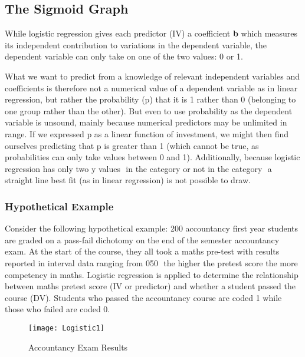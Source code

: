 \documentclass[a4paper,12pt]{article}
\begin{document}
\subsection{The Sigmoid Graph}
While logistic regression gives each predictor (IV) a coefficient \textbf{b} which measures its
independent contribution to variations in the dependent variable, the dependent variable
can only take on one of the two values: 0 or 1.

What we want to predict from a knowledge of relevant independent variables and coefficients is therefore not a numerical value of a
dependent variable as in linear regression, but rather the probability (p) that it is 1 rather
than 0 (belonging to one group rather than the other). But even to use probability as the dependent variable is unsound, mainly because numerical predictors may be unlimited in range. If we expressed p as a linear function of investment, we might then find ourselves predicting that p is greater than 1 (which cannot be true, as
probabilities can only take values between 0 and 1). Additionally, because logistic regression
has only two y values  in the category or not in the category  a straight line best fit (as in
linear regression) is not possible to draw.
\subsubsection{Hypothetical Example}
Consider the following hypothetical example:
200 accountancy first year students are graded on a pass-fail dichotomy on the end of the
semester accountancy exam. At the start of the course, they all took a maths pre-test with
results reported in interval data ranging from 050  the higher the pretest score the more
competency in maths. Logistic regression is applied to determine the relationship between
maths pretest score (IV or predictor) and whether a student passed the course (DV). Students
who passed the accountancy course are coded 1 while those who failed are coded 0.
\begin{center}
\begin{figure}
  \texttt{[image: Logistic1]}\\
  \caption{Accountancy Exam Results}
\end{figure}
\end{center}
\end{document}
